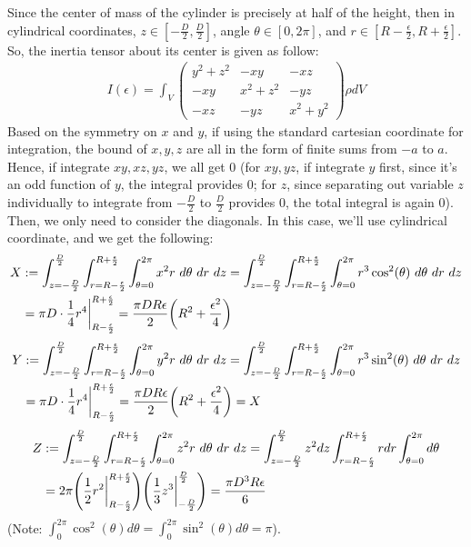 \documentclass{article}
\DeclarePairedDelimiter{\paran}{(}{)}%
\begin{document}
Since the center of mass of the cylinder is precisely at half of the height, then in cylindrical coordinates, $z\in [-\frac{D}{2},\frac{D}{2}]$, angle $\theta\in [0,2\pi]$, and $r\in [R-\frac{\epsilon}{2},R+\frac{\epsilon}{2}]$. So, the inertia tensor about its center is given as follow:
\begin{align}
    I(\epsilon) = \int_V \begin{pmatrix}
        y^2+z^2 & -xy & -xz\\
        -xy & x^2+z^2 & -yz\\
        -xz & -yz & x^2+y^2
    \end{pmatrix}\rho dV
\end{align}
Based on the symmetry on $x$ and $y$, if using the standard cartesian coordinate for integration, the bound of $x,y,z$ are all in the form  of finite sums from $-a$ to $a$. Hence, if integrate $xy,xz,yz$, we all get $0$ (for $xy,yz$, if integrate $y$ first, since it's an odd function of $y$, the integral provides $0$; for $z$, since separating out variable $z$ individually to integrate from $-\frac{D}{2}$ to $\frac{D}{2}$ provides $0$, the total integral is again $0$). Then, we only need to consider the diagonals. In this case, we'll use cylindrical coordinate, and we get the following:
\begin{align}
    X &:= \int_{z=-\frac{D}{2}}^{\frac{D}{2}}\int_{r=R-\frac{\epsilon}{2}}^{R+\frac{\epsilon}{2}}\int_{\theta =0}^{2\pi}x^2 r\ d\theta\ dr\ dz = \int_{z=-\frac{D}{2}}^{\frac{D}{2}}\int_{r=R-\frac{\epsilon}{2}}^{R+\frac{\epsilon}{2}}\int_{\theta =0}^{2\pi}r^3\cos^2(\theta)\ d\theta\ dr\ dz\\
    &= \pi D\cdot\frac{1}{4}r^4\bigg|_{R-\frac{\epsilon}{2}}^{R+\frac{\epsilon}{2}} = \frac{\pi DR\epsilon}{2}\paran*{R^2+\frac{\epsilon^2}{4}}
\end{align}
\begin{align}
    Y &:=\int_{z=-\frac{D}{2}}^{\frac{D}{2}}\int_{r=R-\frac{\epsilon}{2}}^{R+\frac{\epsilon}{2}}\int_{\theta =0}^{2\pi}y^2 r\ d\theta\ dr\ dz = \int_{z=-\frac{D}{2}}^{\frac{D}{2}}\int_{r=R-\frac{\epsilon}{2}}^{R+\frac{\epsilon}{2}}\int_{\theta =0}^{2\pi}r^3\sin^2(\theta)\ d\theta\ dr\ dz\\
    &= \pi D\cdot\frac{1}{4}r^4\bigg|_{R-\frac{\epsilon}{2}}^{R+\frac{\epsilon}{2}} = \frac{\pi DR\epsilon}{2}\paran*{R^2+\frac{\epsilon^2}{4}} = X
\end{align}
\begin{align}
    Z &:=\int_{z=-\frac{D}{2}}^{\frac{D}{2}}\int_{r=R-\frac{\epsilon}{2}}^{R+\frac{\epsilon}{2}}\int_{\theta =0}^{2\pi}z^2 r\ d\theta\ dr\ dz = \int_{z=-\frac{D}{2}}^{\frac{D}{2}}z^2dz\int_{r=R-\frac{\epsilon}{2}}^{R+\frac{\epsilon}{2}}rdr\int_{\theta=0}^{2\pi}d\theta\\
    &= 2\pi\paran*{\frac{1}{2}r^2\bigg|_{R-\frac{\epsilon}{2}}^{R+\frac{\epsilon}{2}}}\paran*{\frac{1}{3}z^3\bigg|_{-\frac{D}{2}}^{\frac{D}{2}}} = \frac{\pi D^3R\epsilon}{6}
\end{align}
(Note: $\int_{0}^{2\pi}\cos^2(\theta)d\theta=\int_{0}^{2\pi}\sin^2(\theta)d\theta=\pi$).
\end{document}
